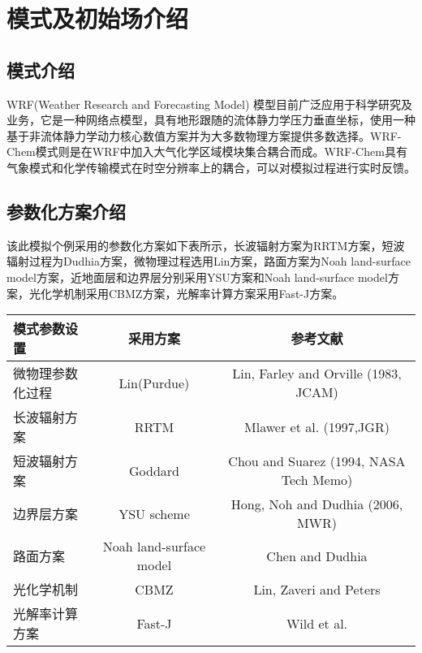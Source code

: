 \chapter{模式及初始场介绍}\label{chap:guide}


\section{模式介绍}

WRF(Weather Research and Forecasting Model) 模型目前广泛应用于科学研究及业务，它是一种网络点模型，具有地形跟随的流体静力学压力垂直坐标，使用一种基于非流体静力学动力核心数值方案并为大多数物理方案提供多数选择。WRF-Chem模式则是在WRF中加入大气化学区域模块集合耦合而成。WRF-Chem具有气象模式和化学传输模式在时空分辨率上的耦合，可以对模拟过程进行实时反馈。

\section{参数化方案介绍}

该此模拟个例采用的参数化方案如下表所示，长波辐射方案为RRTM方案，短波辐射过程为Dudhia方案，微物理过程选用Lin方案，路面方案为Noah land-surface model方案，近地面层和边界层分别采用YSU方案和Noah land-surface model方案，光化学机制采用CBMZ方案，光解率计算方案采用Fast-J方案。

\begin{center}

    \begin{tabular}{lcc}
        \hline
        模式参数设置 & 采用方案 & 参考文献\\
        \hline
				微物理参数化过程 & Lin(Purdue) & Lin, Farley and Orville (1983, JCAM)\\
				长波辐射方案 & RRTM & Mlawer et al. (1997,JGR)\\
				短波辐射方案 & Goddard & Chou and Suarez (1994, NASA Tech Memo)\\
				边界层方案 & YSU scheme & Hong, Noh and Dudhia (2006, MWR)\\
				路面方案 & Noah land-surface model & Chen and Dudhia \\
				光化学机制 & CBMZ & Lin, Zaveri and Peters\\
				光解率计算方案 & Fast-J & Wild et al.\\
        \hline
    \end{tabular}
\end{center}

